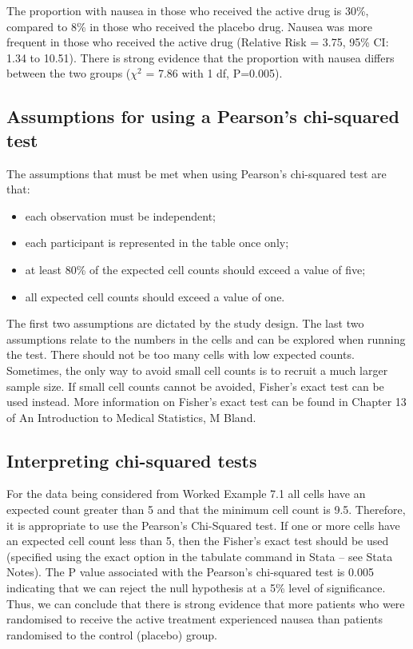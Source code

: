 \documentclass[
]{memoir}
\providecommand{\tightlist}{%
  \setlength{\itemsep}{0pt}\setlength{\parskip}{0pt}}
\begin{document}
The proportion with nausea in those who received the active drug is 30\%, compared to 8\% in those who received the placebo drug. Nausea was more frequent in those who received the active drug (Relative Risk = 3.75, 95\% CI: 1.34 to 10.51). There is strong evidence that the proportion with nausea differs between the two groups (\(\chi ^2\) = 7.86 with 1 df, P=0.005).

\hypertarget{assumptions-for-using-a-pearsons-chi-squared-test}{%
\subsection{Assumptions for using a Pearson's chi-squared test}\label{assumptions-for-using-a-pearsons-chi-squared-test}}

The assumptions that must be met when using Pearson's chi-squared test are that:

\begin{itemize}
\tightlist
\item
  each observation must be independent;
\item
  each participant is represented in the table once only;
\item
  at least 80\% of the expected cell counts should exceed a value of five;
\item
  all expected cell counts should exceed a value of one.
\end{itemize}

The first two assumptions are dictated by the study design. The last two assumptions relate to the numbers in the cells and can be explored when running the test. There should not be too many cells with low expected counts. Sometimes, the only way to avoid small cell counts is to recruit a much larger sample size. If small cell counts cannot be avoided, Fisher's exact test can be used instead. More information on Fisher's exact test can be found in Chapter 13 of An Introduction to Medical Statistics, M Bland.

\hypertarget{interpreting-chi-squared-tests}{%
\subsection{Interpreting chi-squared tests}\label{interpreting-chi-squared-tests}}

For the data being considered from Worked Example 7.1 all cells have an expected count greater than 5 and that the minimum cell count is 9.5. Therefore, it is appropriate to use the Pearson's Chi-Squared test. If one or more cells have an expected cell count less than 5, then the Fisher's exact test should be used (specified using the exact option in the tabulate command in Stata -- see Stata Notes). The P value associated with the Pearson's chi-squared test is 0.005 indicating that we can reject the null hypothesis at a 5\% level of significance. Thus, we can conclude that there is strong evidence that more patients who were randomised to receive the active treatment experienced nausea than patients randomised to the control (placebo) group.
\end{document}
